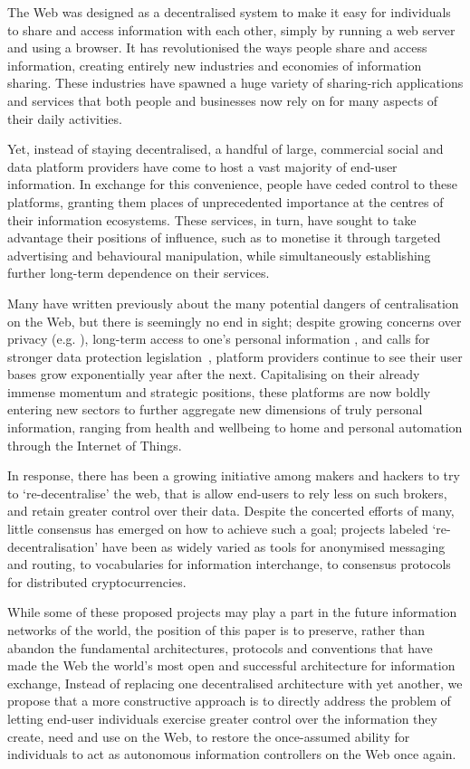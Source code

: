 \documentclass{amsart}
\begin{document}
The Web was designed as a decentralised system to make it easy for individuals to share and access information with each other, simply by running a web server and using a browser.  It has revolutionised the ways people share and access information, creating entirely new industries and economies of information sharing.  These industries have spawned a huge variety of sharing-rich applications and services that both people and businesses now rely on for many aspects of their daily activities.  

Yet, instead of staying decentralised, a handful of large, commercial social and data platform providers have come to host a vast majority of end-user information.  In exchange for this convenience, people have ceded control to these platforms, granting them places of unprecedented importance at the centres of their information ecosystems. These services, in turn, have sought to take advantage their positions of influence, such as to monetise it through targeted advertising and behavioural manipulation, while simultaneously establishing further long-term dependence on their services.

Many have written previously about the many potential dangers of centralisation on the Web, but there is seemingly no end in sight; despite growing concerns over privacy (e.g. \cite{}), long-term access to one's personal information \cite{}, and calls for stronger data protection legislation~\cite{}, platform providers continue to see their user bases grow exponentially year after the next.  Capitalising on their already immense momentum and strategic positions, these platforms are now boldly entering new sectors to further aggregate new dimensions of truly personal information, ranging from health and wellbeing to home and personal automation through the Internet of Things.  

In response, there has been a growing initiative among makers and hackers to try to `re-decentralise' the web, that is allow end-users to rely less on such brokers, and retain greater control over their data.  Despite the concerted efforts of many, little consensus has emerged on how to achieve such a goal; projects labeled `re-decentralisation' have been as widely varied as tools for anonymised messaging and routing, to vocabularies for information interchange, to consensus protocols for distributed cryptocurrencies.

While some of these proposed projects may play a part in the future information networks of the world, the position of this paper is to preserve, rather than abandon the fundamental architectures, protocols and conventions that have made the Web the world's most open and successful architecture for information exchange,   Instead of replacing one decentralised architecture with yet another, we propose that a more constructive approach is to directly address the problem of letting end-user individuals exercise greater control over the information they create, need and use on the Web, to restore the once-assumed ability for individuals to act as autonomous information controllers on the Web once again. 
\end{document}

